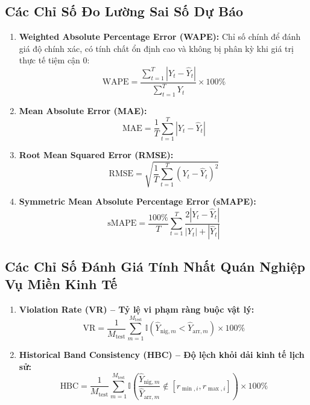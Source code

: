 \subsection{Các Chỉ Số Đo Lường Sai Số Dự Báo}
\begin{enumerate}
    \item \textbf{Weighted Absolute Percentage Error (WAPE):} Chỉ số chính để đánh giá độ chính xác, có tính chất ổn định cao và không bị phân kỳ khi giá trị thực tế tiệm cận 0:
    \begin{equation}
        \text{WAPE} = \frac{\sum_{t=1}^T |Y_t - \hat{Y}_t|}{\sum_{t=1}^T Y_t} \times 100\%
    \end{equation}
    \item \textbf{Mean Absolute Error (MAE):}
    \begin{equation}
        \text{MAE} = \frac{1}{T} \sum_{t=1}^T |Y_t - \hat{Y}_t|
    \end{equation}
    \item \textbf{Root Mean Squared Error (RMSE):}
    \begin{equation}
        \text{RMSE} = \sqrt{\frac{1}{T} \sum_{t=1}^T (Y_t - \hat{Y}_t)^2}
    \end{equation}
    \item \textbf{Symmetric Mean Absolute Percentage Error (sMAPE):}
    \begin{equation}
        \text{sMAPE} = \frac{100\%}{T} \sum_{t=1}^T \frac{2 |Y_t - \hat{Y}_t|}{|Y_t| + |\hat{Y}_t|}
    \end{equation}
\end{enumerate}

\subsection{Các Chỉ Số Đánh Giá Tính Nhất Quán Nghiệp Vụ Miền Kinh Tế}
\begin{enumerate}
    \item \textbf{Violation Rate (VR) -- Tỷ lệ vi phạm ràng buộc vật lý:}
    \begin{equation}
        \text{VR} = \frac{1}{M_{\text{test}}} \sum_{m=1}^{M_{\text{test}}} \mathbb{I}\left( \hat{Y}_{\text{nig}, m} < \hat{Y}_{\text{arr}, m} \right) \times 100\%
    \end{equation}
    \item \textbf{Historical Band Consistency (HBC) -- Độ lệch khỏi dải kinh tế lịch sử:}
    \begin{equation}
        \text{HBC} = \frac{1}{M_{\text{test}}} \sum_{m=1}^{M_{\text{test}}} \mathbb{I}\left( \frac{\hat{Y}_{\text{nig}, m}}{\hat{Y}_{\text{arr}, m}} \notin [r_{\min, i}, r_{\max, i}] \right) \times 100\%
    \end{equation}
\end{enumerate}

